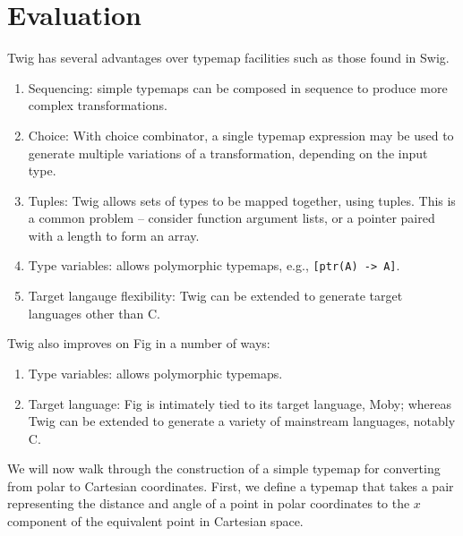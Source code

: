 
\section{Evaluation}

Twig has several advantages over typemap facilities such as those found in Swig.

\begin{enumerate}

\item Sequencing: simple typemaps can be composed in sequence to produce more complex transformations.

\item Choice: With choice combinator, a single typemap expression may be used to generate multiple variations of a transformation, depending on the input type.

\item Tuples: Twig allows sets of types to be mapped together, using tuples. This is a common problem -- consider function argument lists, or a pointer paired with a length to form an array.

\item Type variables: allows polymorphic typemaps, e.g., \texttt{[ptr(A) -> A]}.
  
\item Target langauge flexibility: Twig can be extended to generate target languages other than C.

\end{enumerate}

Twig also improves on Fig in a number of ways:

\begin{enumerate}

\item Type variables: allows polymorphic typemaps.

\item Target language: Fig is intimately tied to its target language, Moby; whereas Twig can be extended to generate a variety of mainstream languages, notably C.

\end{enumerate}

We will now walk through the construction of a simple typemap for converting from polar to Cartesian coordinates. First, we define a typemap that takes a pair representing the distance and angle of a point in polar coordinates to the $x$ component of the equivalent point in Cartesian space.

